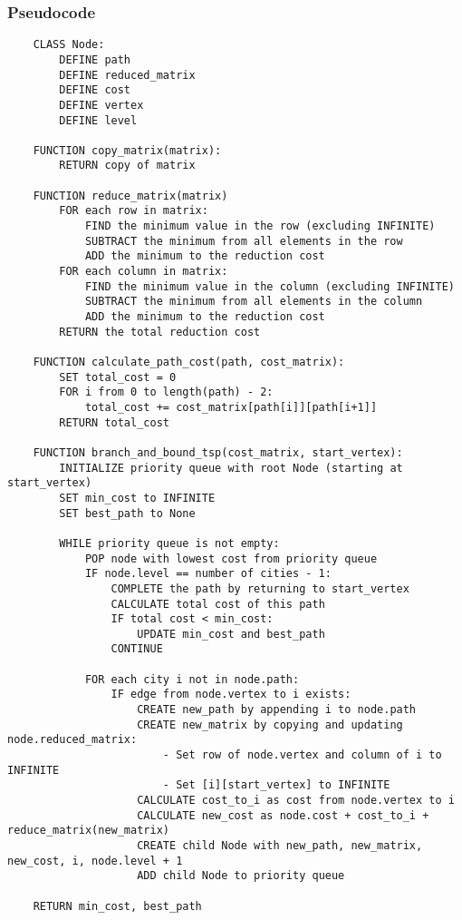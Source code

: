 \documentclass{article}
\begin{document}
\subsubsection*{Pseudocode}
\begin{lstlisting}
    CLASS Node:
        DEFINE path
        DEFINE reduced_matrix
        DEFINE cost
        DEFINE vertex
        DEFINE level

    FUNCTION copy_matrix(matrix):
        RETURN copy of matrix
    
    FUNCTION reduce_matrix(matrix)
        FOR each row in matrix:
            FIND the minimum value in the row (excluding INFINITE)
            SUBTRACT the minimum from all elements in the row
            ADD the minimum to the reduction cost
        FOR each column in matrix:
            FIND the minimum value in the column (excluding INFINITE)
            SUBTRACT the minimum from all elements in the column
            ADD the minimum to the reduction cost
        RETURN the total reduction cost 

    FUNCTION calculate_path_cost(path, cost_matrix):
        SET total_cost = 0
        FOR i from 0 to length(path) - 2:
            total_cost += cost_matrix[path[i]][path[i+1]]
        RETURN total_cost

    FUNCTION branch_and_bound_tsp(cost_matrix, start_vertex):
        INITIALIZE priority queue with root Node (starting at start_vertex)
        SET min_cost to INFINITE
        SET best_path to None

        WHILE priority queue is not empty:
            POP node with lowest cost from priority queue
            IF node.level == number of cities - 1:
                COMPLETE the path by returning to start_vertex
                CALCULATE total cost of this path
                IF total cost < min_cost:
                    UPDATE min_cost and best_path
                CONTINUE

            FOR each city i not in node.path:
                IF edge from node.vertex to i exists:
                    CREATE new_path by appending i to node.path
                    CREATE new_matrix by copying and updating node.reduced_matrix:
                        - Set row of node.vertex and column of i to INFINITE
                        - Set [i][start_vertex] to INFINITE
                    CALCULATE cost_to_i as cost from node.vertex to i
                    CALCULATE new_cost as node.cost + cost_to_i + reduce_matrix(new_matrix)
                    CREATE child Node with new_path, new_matrix, new_cost, i, node.level + 1
                    ADD child Node to priority queue

    RETURN min_cost, best_path


\end{lstlisting}
\end{document}
